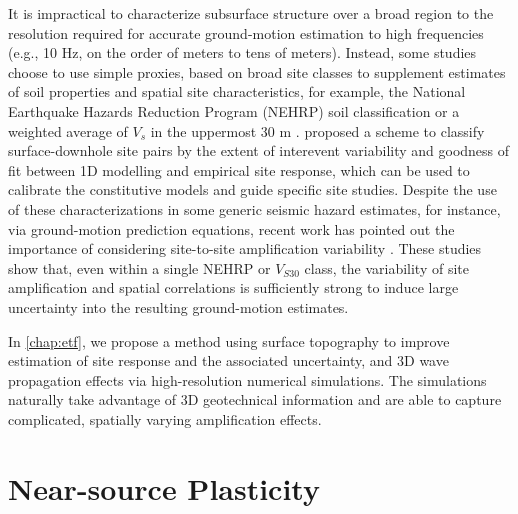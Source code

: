 It is impractical to characterize subsurface structure over a broad region to the resolution required for accurate ground-motion estimation to high frequencies (e.g., 10 Hz, on the order of meters to tens of meters). Instead, some studies choose to use simple proxies, based on broad site classes to supplement estimates of soil properties and spatial site characteristics, for example, the National Earthquake Hazards Reduction Program (NEHRP) soil classification \citep{bssc2003NEHRPRecommended2003,akkarEmpiricalEquationsPrediction2010} or a weighted average of $V_s$ in the uppermost 30 m \citep[$V_{S30}$, e.g., ][]{abrahamsonSummaryAbrahamsonSilva2008,idrissNGAWest2EmpiricalModel2014}. \citet{thompsonTaxonomySiteResponse2012} proposed a scheme to classify surface-downhole site pairs by the extent of interevent variability and goodness of fit between 1D modelling and empirical site response, which can be used to calibrate the constitutive models and guide specific site studies. Despite the use of these characterizations in some generic seismic hazard estimates, for instance, via ground-motion prediction equations, recent work has pointed out the importance of considering site-to-site amplification variability \citep{atkinsonEarthquakeGroundmotionPrediction2006,atikVariabilityGroundmotionPrediction2010}. These studies show that, even within a single NEHRP or $V_{S30}$ class, the variability of site amplification and spatial correlations is sufficiently strong to induce large uncertainty into the resulting ground-motion estimates.

In \cref{chap:etf}, we propose a method using surface topography to improve estimation of site response and the associated uncertainty, and 3D wave propagation effects via high-resolution numerical simulations. The simulations naturally take advantage of 3D geotechnical information and are able to capture complicated, spatially varying amplification effects.

\section{Near-source Plasticity}


